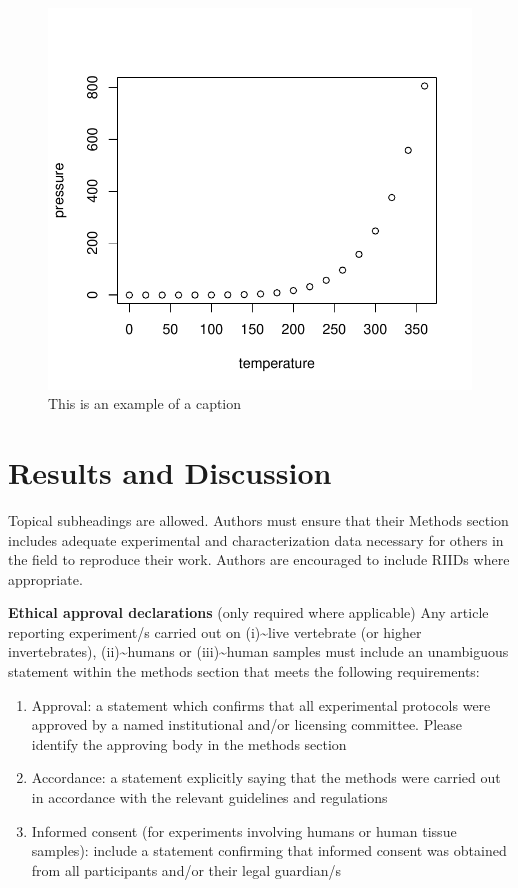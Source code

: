 \documentclass[sn-apa,referee,pdflatex]{sn-jnl}
\begin{document}
\begin{figure}
\includegraphics{PaperTRA_files/figure-latex/fig1-1} \caption{This is an example of a caption}\label{fig:fig1}
\end{figure}

\hypertarget{sec11}{%
\section{Results and Discussion}\label{sec11}}

Topical subheadings are allowed. Authors must ensure that their Methods
section includes adequate experimental and characterization data
necessary for others in the field to reproduce their work. Authors are
encouraged to include RIIDs where appropriate.

\textbf{Ethical approval declarations} (only required where applicable)
Any article reporting experiment/s carried out on
(i)\textasciitilde live vertebrate (or higher invertebrates),
(ii)\textasciitilde humans or (iii)\textasciitilde human samples must
include an unambiguous statement within the methods section that meets
the following requirements:

\begin{enumerate}
\def\labelenumi{\arabic{enumi}.}
\item
  Approval: a statement which confirms that all experimental protocols
  were approved by a named institutional and/or licensing committee.
  Please identify the approving body in the methods section
\item
  Accordance: a statement explicitly saying that the methods were
  carried out in accordance with the relevant guidelines and regulations
\item
  Informed consent (for experiments involving humans or human tissue
  samples): include a statement confirming that informed consent was
  obtained from all participants and/or their legal guardian/s
\end{enumerate}
\end{document}

